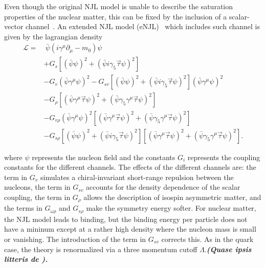 \documentclass[prc, reprint, amsmath, floatfix, linenumbers,10pt]{revtex4-1}
\newcommand{\comment}[1]{{\bf\textit{#1}}}
\begin{document}
Even though the original NJL model is unable to describe the saturation properties of the nuclear matter, this can be fixed by the inclusion of a scalar-vector channel~\cite{Koch1987}. An extended NJL model (eNJL)~\cite{Pais2016} which includes such channel is given by the lagrangian density
\begin{equation}\label{Eq:Lagrangiana_eNLJ_Pais}
\begin{split}
	\mathcal{L} =&~ \bar{\psi}(i\gamma^\mu\partial_\mu - m_0)\psi \\
	& + G_s[(\bar{\psi}\psi)^2 + (\bar{\psi}i\gamma_5\vec{\tau}\psi)^2] \\
	& - G_v(\bar{\psi}\gamma^\mu\psi)^2 - G_{sv}[(\bar{\psi}\psi)^2 + (\bar{\psi}i\gamma_5\vec{\tau}\psi)^2](\bar{\psi}\gamma^\mu\psi)^2 \\
	& - G_\rho[(\bar{\psi}\gamma^\mu\vec{\tau}\psi)^2 + (\bar{\psi}\gamma_5\gamma^\mu\vec{\tau}\psi)^2] \\
	& - G_{v\rho}(\bar{\psi}\gamma^\mu\psi)^2[(\bar{\psi}\gamma^\mu\vec{\tau}\psi)^2 + (\bar{\psi}\gamma_5\gamma^\mu\vec{\tau}\psi)^2] \\
	& - G_{s\rho} [(\bar{\psi}\psi)^2 + (\bar{\psi}i\gamma_5\vec{\tau}\psi)^2][(\bar{\psi}\gamma^\mu\vec{\tau}\psi)^2 + (\bar{\psi}\gamma_5\gamma^\mu\vec{\tau}\psi)^2].
\end{split}
\end{equation}
%

where $\psi$ represents the nucleon field and the constants $G_i$ represents the coupling constants for the different channels. The effects of the different channels are: the term in $G_v$ simulates a chiral-invariant short-range repulsion between the nucleons, the term in $G_{sv}$ accounts for the density dependence of the scalar coupling, the term in $G_\rho$ allows the description of isospin asymmetric matter, and the terms in $G_{\omega\rho}$ and $G_{s\rho}$ make the symmetry energy softer. For nuclear matter, the NJL model leads to binding, but the binding energy per particle does not have a mininum except at a rather high density where the nucleon mass is small or vanishing. The introduction of the term in $G_{sv}$ corrects this. As in the quark case, the theory is renormalized via a three momentum cutoff $\Lambda$.\comment{(Quase ipsis litteris de \cite{Pais2016}).}
\end{document}
